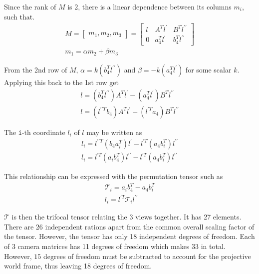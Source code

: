 Since the rank of $M$ is 2, there is a linear dependence between its columns $m_i$, such that.
\begin{gather*}
M = \begin{bmatrix} m_1, m_2,m_3 \end{bmatrix} = \begin{bmatrix} l & A^{T}l^{\prime} & B^{T}l^{\prime \prime} \\
  0 & a^{T}_{4}l^{\prime} & b^{T}_{4}l^{\prime \prime}
\end{bmatrix}\\
m_1 = \alpha m_2 + \beta m_3
\end{gather*}

From the 2nd row of $M$, $\alpha = k(b^{T}_4 l^{\prime \prime})$ and $\beta = -k(a^{T}_4 l^{\prime})$ for some scalar $k$. Applying this back to the 1st row get
\begin{gather*}
l = (b^{T}_4 l^{\prime \prime })A^{T}l^{\prime} - (a^{T}_4 l^{\prime})B^{T}l^{\prime \prime}\\
l = (l^{\prime \prime T} b_{4})A^{T}l^{\prime} - (l^{\prime T} a_{4})B^{T}l^{\prime \prime}
\end{gather*}

The \texttt{i}-th coordinate $l_i$ of $l$ may be written as
\begin{gather*}
  l_i = l^{\prime \prime T} (b_{4}a^{T}_{i}) l^{\prime} - l^{\prime T}(a_{4}b^{T}_{i}) l^{\prime \prime}\\
  l_i = l^{\prime T} (a_{i}b^{T}_{4}) l^{\prime \prime} - l^{\prime T}(a_{4}b^{T}_{i}) l^{\prime \prime}
\end{gather*}

This relationship can be expressed with the permutation tensor such as
\begin{gather}
  \mathcal{T}_{i} = a_{i}b^{T}_{4} - a_{4}b^{T}_{i} \label{eq:trifocalgeometry1}\\
  l_i = l^{\prime T} \mathcal{T}_{i} l^{\prime \prime} \label{eq:trifocalgeometry2}
\end{gather}

$\mathcal{T}$ is then the trifocal tensor relating the 3 views together. It has 27 elements. There are 26 independent rations apart from the common overall scaling factor of the tensor. However, the tensor has only 18 independent degrees of freedom. Each of 3 camera matrices has 11 degrees of freedom which makes $33$ in total. However, $15$ degrees of freedom must be subtracted to account for the projective world frame, thus leaving 18 degrees of freedom.

